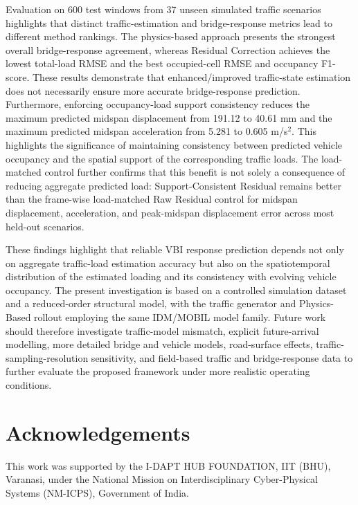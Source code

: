 \documentclass[journal]{IEEEtran}
\begin{document}
Evaluation on 600 test windows from 37 unseen simulated traffic scenarios highlights that distinct traffic-estimation and bridge-response metrics lead to different method rankings. The physics-based approach presents the strongest overall bridge-response agreement, whereas Residual Correction achieves the lowest total-load RMSE and the best occupied-cell RMSE and occupancy F1-score. These results demonstrate that enhanced/improved traffic-state estimation does not necessarily ensure more accurate bridge-response prediction. Furthermore, enforcing occupancy-load support consistency reduces the maximum predicted midspan displacement from 191.12 to 40.61 mm and the maximum predicted midspan acceleration from 5.281 to 0.605 m/s$^2$. This highlights the significance of maintaining consistency between predicted vehicle occupancy and the spatial support of the corresponding traffic loads. {\color{blue}The load-matched control further confirms that this benefit is not solely a consequence of reducing aggregate predicted load: Support-Consistent Residual remains better than the frame-wise load-matched Raw Residual control for midspan displacement, acceleration, and peak-midspan displacement error across most held-out scenarios.}

These findings highlight that reliable VBI response prediction depends not only on aggregate traffic-load estimation accuracy but also on the spatiotemporal distribution of the estimated loading and its consistency with evolving vehicle occupancy. The present investigation is based on a controlled simulation dataset and a reduced-order structural model, with the traffic generator and Physics-Based rollout employing the same IDM/MOBIL model family. {\color{blue}Future work should therefore investigate traffic-model mismatch, explicit future-arrival modelling, more detailed bridge and vehicle models, road-surface effects, traffic-sampling-resolution sensitivity, and field-based traffic and bridge-response data to further evaluate the proposed framework under more realistic operating conditions.}



\section*{Acknowledgements}

This work was supported by the I-DAPT HUB FOUNDATION,
IIT (BHU), Varanasi, under the National Mission on
Interdisciplinary Cyber-Physical Systems (NM-ICPS),
Government of India.
\end{document}
